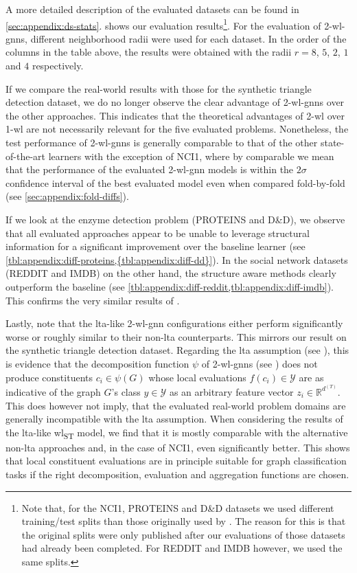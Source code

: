 A more detailed description of the evaluated datasets can be found in \cref{sec:appendix:ds-stats}.
 shows our evaluation results\footnote{
	Note that, for the NCI1, PROTEINS and D\&D datasets we used different training/test splits than those originally used by \citet{Errica2020}.
	The reason for this is that the original splits were only published after our evaluations of those datasets had already been completed.
	For REDDIT and IMDB however, we used the same splits.
}.
For the evaluation of 2-\acs{wl}-\acsp{gnn}, different neighborhood radii were used for each dataset.
In the order of the columns in the table above, the results were obtained with the radii $r = 8$, $5$, $2$, $1$ and $4$ respectively.

If we compare the real-world results with those for the synthetic triangle detection dataset, we do no longer observe the clear advantage of 2-\acs{wl}-\acsp{gnn} over the other approaches.
This indicates that the theoretical advantages of 2-\acs{wl} over 1-\acs{wl} are not necessarily relevant for the five evaluated problems.
Nonetheless, the test performance of 2-\acs{wl}-\acsp{gnn} is generally comparable to that of the other state-of-the-art learners with the exception of NCI1,
where by comparable we mean that the performance of the evaluated 2-\acs{wl}-\acs{gnn} models is within the $2\sigma$ confidence interval of the best evaluated model even when compared fold-by-fold (see \cref{sec:appendix:fold-diffs}).

If we look at the enzyme detection problem (PROTEINS and D\&D), we observe that all evaluated approaches appear to be unable to leverage structural information for a significant improvement over the baseline learner (see \cref{tbl:appendix:diff-proteins,{tbl:appendix:diff-dd}}).
In the social network datasets (REDDIT and IMDB) on the other hand, the structure aware methods clearly outperform the baseline (see \cref{tbl:appendix:diff-reddit,tbl:appendix:diff-imdb}).
This confirms the very similar results of \citet{Errica2020}.

Lastly, note that the \acs{lta}-like 2-\acs{wl}-\acs{gnn} configurations either perform significantly worse or roughly similar to their non-\acs{lta} counterparts.
This mirrors our result on the synthetic triangle detection dataset.
Regarding the \acs{lta} assumption (see ), this is evidence that the decomposition function $\psi$ of 2-\acs{wl}-\acsp{gnn} (see ) does not produce constituents $c_i \in \psi(G)$ whose local evaluations $f(c_i) \in \mathcal{Y}$ are as indicative of the graph $G$'s class $y \in \mathcal{Y}$ as an arbitrary feature vector $z_i \in \mathbb{R}^{d^{(T)}}$.
This does however not imply, that the evaluated real-world problem domains are generally incompatible with the \ac{lta} assumption.
When considering the results of the \ac{lta}-like \acs{wl}\textsubscript{ST} model, we find that it is mostly comparable with the alternative non-\acs{lta} approaches and, in the case of NCI1, even significantly better.
This shows that local constituent evaluations are in principle suitable for graph classification tasks if the right decomposition, evaluation and aggregation functions are chosen.

